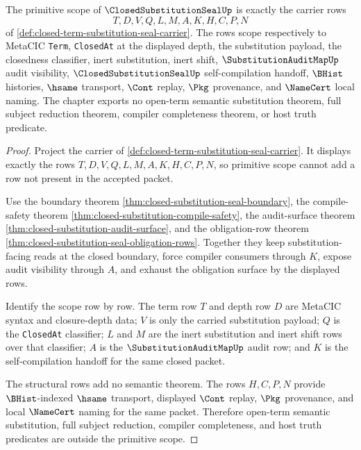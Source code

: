 \begin{theorem}
\label{thm:closed-substitution-seal-primitive-scope}
The primitive scope of $\ClosedSubstitutionSealUp$ is exactly the carrier rows
$$
T,D,V,Q,L,M,A,K,H,C,P,N
$$
of \autoref{def:closed-term-substitution-seal-carrier}. The rows scope respectively to MetaCIC \texttt{Term}, \texttt{ClosedAt} at the displayed depth, the substitution payload, the closedness classifier, inert substitution, inert shift, $\SubstitutionAuditMapUp$ audit visibility, $\ClosedSubstitutionSealUp$ self-compilation handoff, $\BHist$ histories, $\hsame$ transport, $\Cont$ replay, $\Pkg$ provenance, and $\NameCert$ local naming. The chapter exports no open-term semantic substitution theorem, full subject reduction theorem, compiler completeness theorem, or host truth predicate.
\end{theorem}
\begin{proof}
Project the carrier of \autoref{def:closed-term-substitution-seal-carrier}. It displays exactly the rows $T,D,V,Q,L,M,A,K,H,C,P,N$, so primitive scope cannot add a row not present in the accepted packet.

Use the boundary theorem \autoref{thm:closed-substitution-seal-boundary}, the compile-safety theorem \autoref{thm:closed-substitution-compile-safety}, the audit-surface theorem \autoref{thm:closed-substitution-audit-surface}, and the obligation-row theorem \autoref{thm:closed-substitution-seal-obligation-rows}. Together they keep substitution-facing reads at the closed boundary, force compiler consumers through $K$, expose audit visibility through $A$, and exhaust the obligation surface by the displayed rows.

Identify the scope row by row. The term row $T$ and depth row $D$ are MetaCIC syntax and closure-depth data; $V$ is only the carried substitution payload; $Q$ is the \texttt{ClosedAt} classifier; $L$ and $M$ are the inert substitution and inert shift rows over that classifier; $A$ is the $\SubstitutionAuditMapUp$ audit row; and $K$ is the self-compilation handoff for the same closed packet.

The structural rows add no semantic theorem. The rows $H,C,P,N$ provide $\BHist$-indexed $\hsame$ transport, displayed $\Cont$ replay, $\Pkg$ provenance, and local $\NameCert$ naming for the same packet. Therefore open-term semantic substitution, full subject reduction, compiler completeness, and host truth predicates are outside the primitive scope.
\end{proof}


